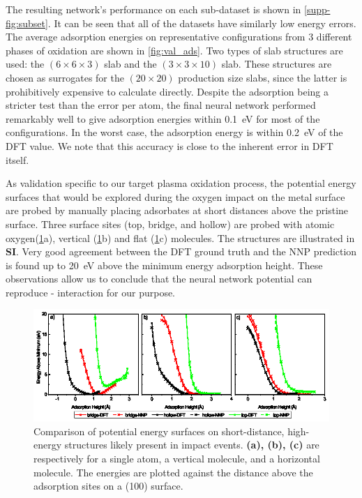 \documentclass[manuscript=cmatex]{achemso}
\begin{document}
The resulting network's performance on each sub-dataset is shown in \cref{supp-fig:subset}. It can be seen that all of the datasets have similarly low energy errors. The average adsorption energies on representative configurations from 3 different phases of oxidation are shown in \cref{fig:val_ads}. Two types of slab structures are used: the $(6\times6\times3)$ slab and the $(3\times3\times10)$ slab. These structures are chosen as surrogates for the $(20\times20)$ production size slabs, since the latter is prohibitively expensive to calculate directly. Despite the adsorption being a stricter test than the error per atom, the final neural network performed remarkably well to give adsorption energies within \SI{0.1}{eV} for most of the configurations. In the worst case, the adsorption energy is within \SI{0.2}{eV} of the DFT value. We note that this accuracy is close to the inherent error in DFT itself.

As validation specific to our target plasma oxidation process, the potential energy surfaces that would be explored during the oxygen impact on the metal surface are probed by manually placing adsorbates at short distances above the pristine  surface. Three surface sites (top, bridge, and hollow) are probed with atomic oxygen(\ref{fig:val_close}a), vertical (\ref{fig:val_close}b) and flat (\ref{fig:val_close}c)  molecules. The structures are illustrated in \textbf{SI}. Very good agreement between the DFT ground truth and the NNP prediction is found up to \SI{20}{eV} above the minimum energy adsorption height. These observations allow us to conclude that the neural network potential can reproduce - interaction for our purpose.

\begin{figure}[h]
  \centering
  \includegraphics[width=\textwidth]{originprojects/closefig}
  \caption[Comparison of the PES calculated using DFT and NNP on simulated impact event]{Comparison of potential energy surfaces on short-distance, high-energy structures likely present in impact events. \textbf{(a), (b), (c)} are respectively for a single  atom, a vertical  molecule, and a horizontal  molecule. The energies are plotted against the distance above the adsorption sites on a  (100) surface.}
  \label{fig:val_close}
\end{figure}
\end{document}
